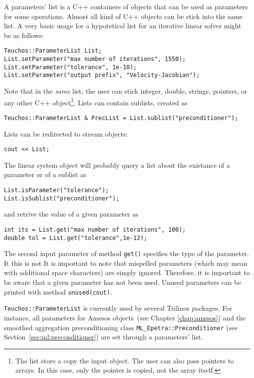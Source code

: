 A parameters' list is a C++ containers of objects that can be used as
parameters for some operations. Almost all kind of C++ objects can be
stick into the same list. A very basic usage for a hypotetical list for
an iterative linear solver might be as follows:
\begin{verbatim}
Teuchos::ParameterList List;
List.setParameter("max number of iterations", 1550);
List.setParameter("tolerance", 1e-10);
List.setParameter("output prefix", "Velocity-Jacobian");
\end{verbatim}
Note that in the {\sl same} list, the user can stick integer, double,
strings, pointers, or any other C++ object\footnote{The list store a
  copy the input object. The user can also pass pointers to arrays. In
  this case, only the pointer is copied, not the array itself.}.  Lists
can contain sublists, created as
\begin{verbatim}
Teuchos::ParameterList & PrecList = List.sublist("preconditioner");
\end{verbatim}
Lists can be redirected to stream objects:
\begin{verbatim}
cout << List;
\end{verbatim}
The linear system object will probably query a list about the existance
of a parameter or of a sublist as
\begin{verbatim}
List.isParameter("tolerance");
List.isSublist("preconditioner");
\end{verbatim}
and retrive the value of a given parameter as
\begin{verbatim}
int its = List.get("max number of iterations", 100);
double tol = List.get("tolerance",1e-12);
\end{verbatim}
The second input parameter of method \verb!get()! specifies the type of
the parameter. It this is not 
It is important to note that mispelled parameters (which may mean with
additional space characters) are simply ignored. Therefore, it is
important to be aware that a given parameter has not been used. Unused
parameters can be printed with method \verb!unused(cout)!.

\begin{remark}
  \verb!Teuchos::ParameterList! is currently used by several Trilinos
  packages. For instance, all parameters for Amesos objects~(see Chapter
  \ref{chap:amesos}) and the smoothed aggregation preconditioning class
  \verb!ML_Epetra::Preconditioner! (see
  Section~\ref{sec:ml:preconditioner}) are set through a parameters'
  list.
\end{remark}


